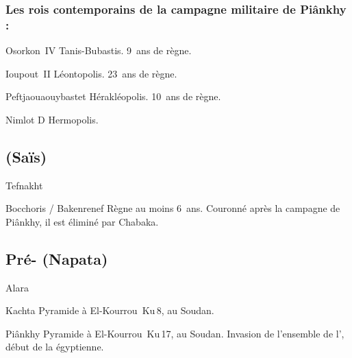 \subsubsection{Les rois contemporains de la campagne militaire 
               de Piânkhy :}
\begin{listerois}
  \item [Osorkon~IV] Tanis-Bubastis. \num{9}~ans de règne.
  \item [Ioupout~II] Léontopolis. \num{23}~ans de règne.
  \item [Peftjaouaouybastet] Hérakléopolis. \num{10}~ans de règne.
  \item [Nimlot D] Hermopolis.
\end{listerois}

\subsection{\texorpdfstring{}{XXIVe dynastie} (Saïs)}

\begin{listerois}
  \item [Tefnakht \datation{(c.~728/7-720)}]
  \item [Bocchoris / Bakenrenef \datation{(c.~\anorange{720}{715})}]
        Règne au moins \num{6}~ans. Couronné après la campagne de 
        Piânkhy, il est éliminé par Chabaka.
\end{listerois}

\subsection{Pré-\texorpdfstring{}{XXVe dynastie} (Napata)}

\begin{listerois}
  \item [Alara \datation{(c.~\anorange{785}{760})}]
  \item [Kachta \datation{(c.~\anorange{760}{750})}] 
        Pyramide à El-Kourrou~Ku\,8, au Soudan.
  \item [Piânkhy \datation{(c.~\anorange{750}{716})}] 
        Pyramide à El-Kourrou~Ku\,17, au Soudan. Invasion de 
        l'ensemble de l'\kmt, début de la  égyptienne.
\end{listerois}

